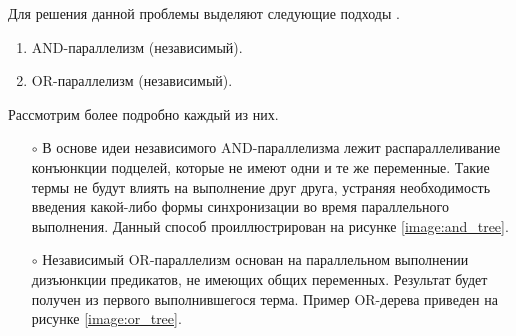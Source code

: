 Для решения данной проблемы выделяют следующие подходы \cite{and_or_parallelism}.
\begin{enumerate}
	\item AND-параллелизм (независимый).
	\vspace{-0.2cm}
	\item OR-параллелизм (независимый).
\end{enumerate}

Рассмотрим более подробно каждый из них.
\begin{itemize}
	\item[$\circ$] В основе идеи независимого AND-параллелизма лежит распараллеливание конъюнкции подцелей, которые не имеют одни и те же переменные. Такие термы не будут влиять на выполнение друг друга, устраняя необходимость введения какой-либо формы синхронизации во время параллельного выполнения. Данный способ проиллюстрирован на рисунке \ref{image:and_tree}.
	\begin{figure}[H]
	\end{figure}
	
	\item[$\circ$] Независимый OR-параллелизм основан на параллельном выполнении дизъюнкции предикатов, не имеющих общих переменных. Результат будет получен из первого выполнившегося терма. Пример OR-дерева приведен на рисунке \ref{image:or_tree}.
	\begin{figure}[H]
	\end{figure}
\end{itemize}

